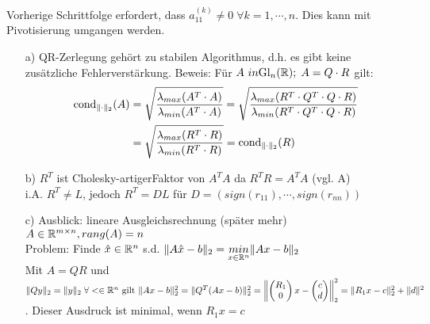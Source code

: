 \begin{Bemerkung}
	Vorherige Schrittfolge erfordert, dass $a_{11}^{(k)} \neq 0 \;\forall k=1,\cdots,n$.
	Dies kann mit Pivotisierung umgangen werden. 
\end{Bemerkung}\hfill
\begin{weitere Bemerkungen}\hfill
	\begin{itemize}
		\item[a)]QR-Zerlegung gehört zu \glqq stabilen Algorithmus\grqq, d.h. es gibt keine zusätzliche Fehlerverstärkung.
Beweis: Für $A \ in \mathrm{Gl}_n(\mathbb R); \; A = Q \cdot R$ gilt:
\begin{align*}
  \mathrm{cond}_{\| \cdot \|_2}(A) &= \sqrt{\frac{\lambda_{max}(A^T \cdot A)}{\lambda_{min}(A^T \cdot A)}} =
\sqrt{\frac{\lambda_{max}(R^T \cdot Q^T \cdot Q \cdot R)}{\lambda_{min}(R^T \cdot Q^T \cdot Q \cdot R)}} \\
&= \sqrt{\frac{\lambda_{max}(R^T \cdot R)}{\lambda_{min}(R^T \cdot R)}} = \mathrm{cond}_{\| \cdot \|_2}(R)
\end{align*}
		\item[b)]$R^T$ ist \glqq Cholesky-artiger\grqq Faktor von $A^TA$ da $R^TR=A^TA$ (vgl. A)\\ i.A. $R^T \neq L$, jedoch $R^T=DL$ für $D=(sign(r_{11}),\cdots,sign(r_{nn}))$
		\item[c)]Ausblick: lineare Ausgleichsrechnung (später mehr)\\
		$A \in\mathbb R^{m\times n}, rang(A)=n$\\
		Problem: Finde $\hat{x} \in \mathbb R^n$ s.d. $\|A\hat{x}-b\|_2=\underset{x\in\mathbb R^n}{min}\|Ax-b\|_2$\\
		Mit $A=QR$ und $\|Qy\|_2=\|y\|_2 \;\forall < \in \mathbb R^n \text{ gilt }\\
      \|Ax-b\|_2^2=\|Q^T(Ax-b)\|_2^2=\left\|\begin{pmatrix}R_1\\0\end{pmatrix}x-\begin{pmatrix}c\\d\end{pmatrix}\right\|_2^2 = \|R_1x-c\|_2^2 + \|d\|^2$. Dieser Ausdruck ist minimal, wenn $R_1x=c$
	\end{itemize}
\end{weitere Bemerkungen}